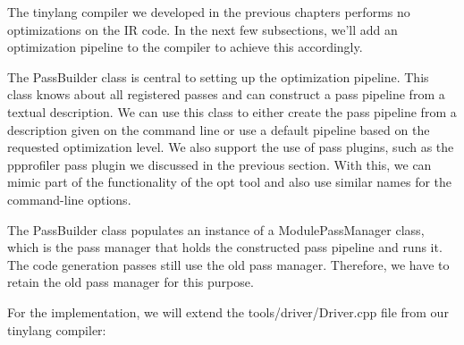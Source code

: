 
The tinylang compiler we developed in the previous chapters performs no optimizations on the IR code. In the next few subsections, we’ll add an optimization pipeline to the compiler to achieve this accordingly.


The PassBuilder class is central to setting up the optimization pipeline. This class knows about all registered passes and can construct a pass pipeline from a textual description. We can use this class to either create the pass pipeline from a description given on the command line or use a default pipeline based on the requested optimization level. We also support the use of pass plugins, such as the ppprofiler pass plugin we discussed in the previous section. With this, we can mimic part of the functionality of the opt tool and also use similar names for the command-line options.

The PassBuilder class populates an instance of a ModulePassManager class, which is the pass manager that holds the constructed pass pipeline and runs it. The code generation passes still use the old pass manager. Therefore, we have to retain the old pass manager for this purpose.

For the implementation, we will extend the tools/driver/Driver.cpp file from our tinylang compiler:

